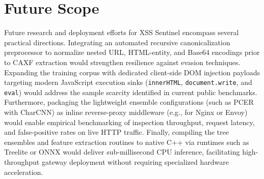 \documentclass[11pt,a4paper]{article}
\begin{document}
\section{Future Scope}
\label{sec:future}

Future research and deployment efforts for XSS Sentinel encompass several practical directions. Integrating an automated recursive canonicalization preprocessor to normalize nested URL, HTML-entity, and Base64 encodings prior to CAXF extraction would strengthen resilience against evasion techniques. Expanding the training corpus with dedicated client-side DOM injection payloads targeting modern JavaScript execution sinks (\texttt{innerHTML}, \texttt{document.write}, and \texttt{eval}) would address the sample scarcity identified in current public benchmarks. Furthermore, packaging the lightweight ensemble configurations (such as PCER with CharCNN) as inline reverse-proxy middleware (e.g., for Nginx or Envoy) would enable empirical benchmarking of inspection throughput, request latency, and false-positive rates on live HTTP traffic. Finally, compiling the tree ensembles and feature extraction routines to native C++ via runtimes such as Treelite or ONNX would deliver sub-millisecond CPU inference, facilitating high-throughput gateway deployment without requiring specialized hardware acceleration.



\end{document}
